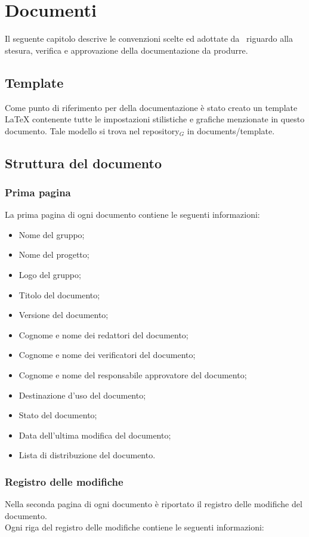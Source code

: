 \section{Documenti}
Il seguente capitolo descrive le convenzioni scelte ed adottate da \gruppo\ riguardo alla stesura, verifica e approvazione della documentazione da produrre.

\subsection{Template}
Come punto di riferimento per della documentazione è stato creato un template \LaTeX{} contenente tutte le impostazioni stilistiche e grafiche menzionate in questo documento. Tale modello si trova nel repository$_{G}$ in documents/template.

\subsection{Struttura del documento}

\subsubsection{Prima pagina}
La prima pagina di ogni documento contiene le seguenti informazioni:

\begin{itemize}
\item Nome del gruppo;
\item Nome del progetto;
\item Logo del gruppo;
\item Titolo del documento;
\item Versione del documento;
\item Cognome e nome dei redattori del documento;
\item Cognome e nome dei verificatori del documento;
\item Cognome e nome del responsabile approvatore del documento;
\item Destinazione d'uso del documento;
\item Stato del documento;
\item Data dell'ultima modifica del documento;
\item Lista di distribuzione del documento.
\end{itemize}

\subsubsection{Registro delle modifiche}
Nella seconda pagina di ogni documento è riportato il registro delle modifiche del documento. \\
Ogni riga del registro delle modifiche contiene le seguenti informazioni:


